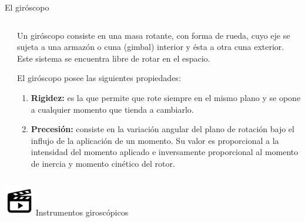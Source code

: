 \begin{frame}{El gir\'oscopo}

      \begin{columns}
        \begin{column}{0.2\textwidth} \centering




          
        \end{column}
      \begin{column}{0.8\textwidth}
      Un gir\'oscopo consiste en una masa rotante, con forma de rueda, 
	cuyo eje se sujeta a una armaz\'on o cuna (gimbal) 
	interior y \'esta a otra cuna exterior. Este sistema se encuentra libre de rotar en el espacio.

      El gir\'oscopo posee las siguientes propiedades:
      \begin{enumerate}
      \item {\bf Rigidez:} es la que permite que rote siempre en el mismo plano y se opone a cualquier momento
	 que tienda a cambiarlo.
      \item {\bf Precesi\'on:} consiste en la variaci\'on angular del plano de rotaci\'on bajo el influjo 
      de la aplicaci\'on de un momento. Su valor es proporcional a la intensidad del momento aplicado e 
      inversamente proporcional al momento de inercia y momento cin\'etico del rotor.
      \end{enumerate}
    \end{column}
    \end{columns}

	\vspace{0.3cm}


  \href{https://www.youtube.com/watch?v=JnKloSdUJLo}{\includegraphics[width=0.1\textwidth]{05.IyA.imagenes/Video.png}}\,Instrumentos girosc\'opicos

\end{frame}

